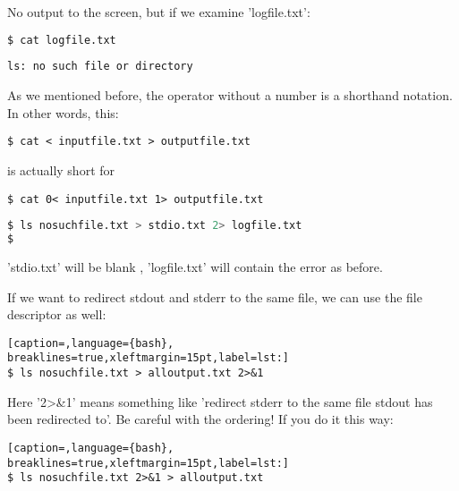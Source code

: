 No output to the screen, but if we examine 'logfile.txt':
\lstset{basicstyle=\scriptsize, numbers=left, captionpos=b, tabsize=4}
\begin{lstlisting}[caption=Checking the logfile,language={bash},
breaklines=true,xleftmargin=15pt,label=lst:Checking the logfile]
$ cat logfile.txt
\end{lstlisting}

\scriptsize
\begin{verbatim}
ls: no such file or directory 
\end{verbatim}
\normalsize

As we mentioned before, the operator without a number is a shorthand notation.
In other words, this:

\scriptsize
\begin{verbatim}
$ cat < inputfile.txt > outputfile.txt
\end{verbatim}
\normalsize

is actually short for
\scriptsize
\begin{verbatim}
$ cat 0< inputfile.txt 1> outputfile.txt
\end{verbatim}
\normalsize

\lstset{basicstyle=\scriptsize, numbers=left, captionpos=b, tabsize=4}
\begin{lstlisting}[caption=We can also redirect both 'stdout' and 'stderr' independently like this:,language={bash},
breaklines=true,xleftmargin=15pt,label=lst:We can also redirect both 'stdout' and 'stderr' independently like this:]
$ ls nosuchfile.txt > stdio.txt 2> logfile.txt 
$
\end{lstlisting}

'stdio.txt' will be blank , 'logfile.txt' will contain the error as before.

If we want to redirect stdout and stderr to the same file, we can use the file
descriptor as well:

\lstset{basicstyle=\scriptsize, numbers=left, captionpos=b, tabsize=4}
\begin{lstlisting}[caption=,language={bash},
breaklines=true,xleftmargin=15pt,label=lst:]
$ ls nosuchfile.txt > alloutput.txt 2>&1
\end{lstlisting}

Here '2\textgreater{}\&1' means something like 'redirect stderr to the same
file stdout has been redirected to'. Be careful with the ordering! If you do it
this way:

\lstset{basicstyle=\scriptsize, numbers=left, captionpos=b, tabsize=4}
\begin{lstlisting}[caption=,language={bash},
breaklines=true,xleftmargin=15pt,label=lst:]
$ ls nosuchfile.txt 2>&1 > alloutput.txt
\end{lstlisting}

